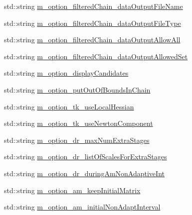 \begin{DoxyCompactItemize}
\item 
std\-::string \hyperlink{class_q_u_e_s_o_1_1_m_l_sampling_level_options_af9ec9aa644d0ee22a42a2aa7fdf49218}{m\-\_\-option\-\_\-filtered\-Chain\-\_\-data\-Output\-File\-Name}
\item 
std\-::string \hyperlink{class_q_u_e_s_o_1_1_m_l_sampling_level_options_a39e79ec1b87802ecd32bf4999908ecbf}{m\-\_\-option\-\_\-filtered\-Chain\-\_\-data\-Output\-File\-Type}
\item 
std\-::string \hyperlink{class_q_u_e_s_o_1_1_m_l_sampling_level_options_a87338f130d6059b62643ad609f26bfb6}{m\-\_\-option\-\_\-filtered\-Chain\-\_\-data\-Output\-Allow\-All}
\item 
std\-::string \hyperlink{class_q_u_e_s_o_1_1_m_l_sampling_level_options_a830bffae5d6cc92fd551db4ef6dfee64}{m\-\_\-option\-\_\-filtered\-Chain\-\_\-data\-Output\-Allowed\-Set}
\item 
std\-::string \hyperlink{class_q_u_e_s_o_1_1_m_l_sampling_level_options_a54c504f38cb33871eb90b38b4ba80e89}{m\-\_\-option\-\_\-display\-Candidates}
\item 
std\-::string \hyperlink{class_q_u_e_s_o_1_1_m_l_sampling_level_options_a1858cab9660831ae92eb12aad280aa67}{m\-\_\-option\-\_\-put\-Out\-Of\-Bounds\-In\-Chain}
\item 
std\-::string \hyperlink{class_q_u_e_s_o_1_1_m_l_sampling_level_options_a341b15acf7986499350294276d25954a}{m\-\_\-option\-\_\-tk\-\_\-use\-Local\-Hessian}
\item 
std\-::string \hyperlink{class_q_u_e_s_o_1_1_m_l_sampling_level_options_a875164924a6fe4ccf52d66db10c272a8}{m\-\_\-option\-\_\-tk\-\_\-use\-Newton\-Component}
\item 
std\-::string \hyperlink{class_q_u_e_s_o_1_1_m_l_sampling_level_options_a20e22ade885c548888ba633bc71b5ab2}{m\-\_\-option\-\_\-dr\-\_\-max\-Num\-Extra\-Stages}
\item 
std\-::string \hyperlink{class_q_u_e_s_o_1_1_m_l_sampling_level_options_ad30c647128dde606b837cbf6c4c32389}{m\-\_\-option\-\_\-dr\-\_\-list\-Of\-Scales\-For\-Extra\-Stages}
\item 
std\-::string \hyperlink{class_q_u_e_s_o_1_1_m_l_sampling_level_options_a8b608af9f098f4d829236c1587b6a971}{m\-\_\-option\-\_\-dr\-\_\-during\-Am\-Non\-Adaptive\-Int}
\item 
std\-::string \hyperlink{class_q_u_e_s_o_1_1_m_l_sampling_level_options_a03b9660a262500e674dcc2afa77af169}{m\-\_\-option\-\_\-am\-\_\-keep\-Initial\-Matrix}
\item 
std\-::string \hyperlink{class_q_u_e_s_o_1_1_m_l_sampling_level_options_a93c77cdea4092dc471e405270c5b226f}{m\-\_\-option\-\_\-am\-\_\-initial\-Non\-Adapt\-Interval}

\end{DoxyCompactItemize}

